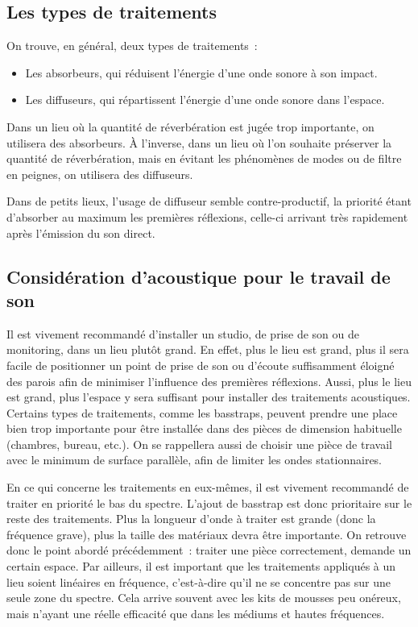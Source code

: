 \documentclass[
  letterpaper,
  DIV=11,
  numbers=noendperiod]{scrreprt}
\providecommand{\tightlist}{%
  \setlength{\itemsep}{0pt}\setlength{\parskip}{0pt}}\usepackage{longtable,booktabs,array}
\begin{document}
\hypertarget{les-types-de-traitements}{%
\subsection{Les types de traitements}\label{les-types-de-traitements}}

On trouve, en général, deux types de traitements~:

\begin{itemize}
\tightlist
\item
  Les absorbeurs, qui réduisent l'énergie d'une onde sonore à son
  impact.
\item
  Les diffuseurs, qui répartissent l'énergie d'une onde sonore dans
  l'espace.
\end{itemize}

Dans un lieu où la quantité de réverbération est jugée trop importante,
on utilisera des absorbeurs. À l'inverse, dans un lieu où l'on souhaite
préserver la quantité de réverbération, mais en évitant les phénomènes
de modes ou de filtre en peignes, on utilisera des diffuseurs.

Dans de petits lieux, l'usage de diffuseur semble contre-productif, la
priorité étant d'absorber au maximum les premières réflexions, celle-ci
arrivant très rapidement après l'émission du son direct.

\hypertarget{considuxe9ration-dacoustique-pour-le-travail-de-son}{%
\subsection{Considération d'acoustique pour le travail de
son}\label{considuxe9ration-dacoustique-pour-le-travail-de-son}}

Il est vivement recommandé d'installer un studio, de prise de son ou de
monitoring, dans un lieu plutôt grand. En effet, plus le lieu est grand,
plus il sera facile de positionner un point de prise de son ou d'écoute
suffisamment éloigné des parois afin de minimiser l'influence des
premières réflexions. Aussi, plus le lieu est grand, plus l'espace y
sera suffisant pour installer des traitements acoustiques. Certains
types de traitements, comme les basstraps, peuvent prendre une place
bien trop importante pour être installée dans des pièces de dimension
habituelle (chambres, bureau, etc.). On se rappellera aussi de choisir
une pièce de travail avec le minimum de surface parallèle, afin de
limiter les ondes stationnaires.

En ce qui concerne les traitements en eux-mêmes, il est vivement
recommandé de traiter en priorité le bas du spectre. L'ajout de basstrap
est donc prioritaire sur le reste des traitements. Plus la longueur
d'onde à traiter est grande (donc la fréquence grave), plus la taille
des matériaux devra être importante. On retrouve donc le point abordé
précédemment~: traiter une pièce correctement, demande un certain
espace. Par ailleurs, il est important que les traitements appliqués à
un lieu soient linéaires en fréquence, c'est-à-dire qu'il ne se
concentre pas sur une seule zone du spectre. Cela arrive souvent avec
les kits de mousses peu onéreux, mais n'ayant une réelle efficacité que
dans les médiums et hautes fréquences.
\end{document}
